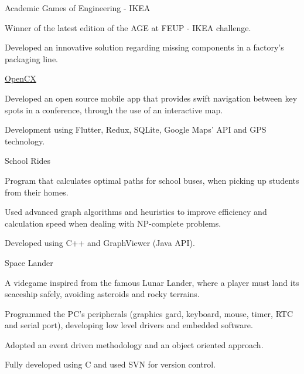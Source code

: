 
\begin{cventries}
  \cventry
    {} %
    {Academic Games of Engineering - IKEA} %
    {} %
    {} %
    {
      \begin{cvitems} %
        \item {Winner of the latest edition of the AGE at FEUP - IKEA challenge.}
		    \item {Developed an innovative solution regarding missing components in a factory's packaging line.}
      \end{cvitems}
    }

  \cventry
    {} %
    {\href{https://github.com/softeng-feup/open-cx}{OpenCX}} %
    {} %
    {} %
    {
      \begin{cvitems} %
      	\item {Developed an open source mobile app that provides swift navigation between key spots in a conference, through the use of an interactive map.}
		    \item {Development using Flutter, Redux, SQLite, Google Maps' API and GPS technology.}
      \end{cvitems}
    }

  \cventry
    {} %
    {School Rides} %
    {} %
    {} %
    {
      \begin{cvitems} %
      	\item {Program that calculates optimal paths for school buses, when picking up students from their homes.}
		    \item {Used advanced graph algorithms and heuristics to improve efficiency and calculation speed when dealing with NP-complete problems.}
		    \item {Developed using C++ and GraphViewer (Java API).}
      \end{cvitems}
    }

    \cventry
    {} %
    {Space Lander} %
    {} %
    {} %
    {
      \begin{cvitems} %
      	\item {A videgame inspired from the famous Lunar Lander, where a player must land its scaceship safely, avoiding asteroids and rocky terrains.}
      	\item {Programmed the PC's peripherals (graphics gard, keyboard, mouse, timer, RTC and serial port), developing low level drivers and embedded software.}
      	\item {Adopted an event driven methodology and an object oriented approach.}
		    \item {Fully developed using C and used SVN for version control.}
      \end{cvitems}
    }    
\end{cventries}